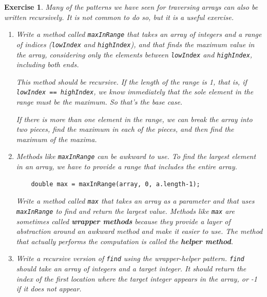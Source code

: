\documentclass[12pt]{book}
\theoremstyle{exercise}
\newtheorem{exercise}{Exercise}[chapter]
\begin{document}
\begin{exercise}
Many of the patterns we have seen for traversing arrays can
also be written recursively.  It is not common to do so, but
it is a useful exercise.

\begin{enumerate}

\item Write a method called {\tt maxInRange} that takes an array of
integers and a range of indices ({\tt lowIndex} and {\tt highIndex}),
and that finds the maximum value in the array, considering only the
elements between {\tt lowIndex} and {\tt highIndex}, including both
ends.

This method should be recursive.  If the length of the range is 1,
that is, if {\tt lowIndex == highIndex}, we know immediately that the
sole element in the range must be the maximum.  So that's the base
case.

If there is more than one element in the range, we can break the array
into two pieces, find the maximum in each of the pieces, and then find
the maximum of the maxima.

\item Methods like {\tt maxInRange} can be awkward to use.  To
find the largest element in an array, we have to provide a range
that includes the entire array.

\begin{lstlisting}
    double max = maxInRange(array, 0, a.length-1);
\end{lstlisting}

Write a method called {\tt max} that takes an array as a parameter
and that uses {\tt maxInRange} to find and return the largest value.
Methods like {\tt max} are sometimes called {\bf wrapper methods}
because they provide a layer of abstraction around an awkward method
and make it easier to use.  The method that actually
performs the computation is called the {\bf helper method}.

\item Write a recursive version of {\tt find} using the
wrapper-helper pattern.  {\tt find} should take an array of
integers and a target integer.  It should return the index
of the first location where the target integer appears in the
array, or -1 if it does not appear.

\end{enumerate}
\end{exercise}
\end{document}
